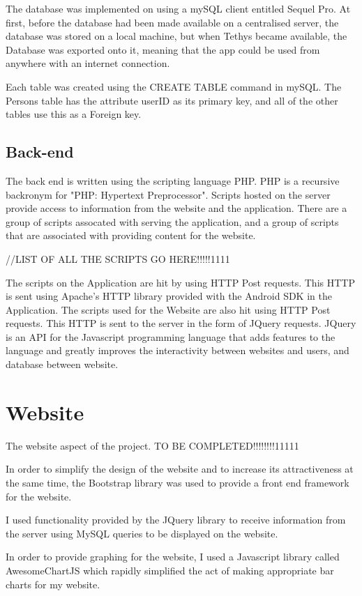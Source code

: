 \documentclass{l4proj}
\begin{document}
The database was implemented on using a mySQL client entitled Sequel Pro. At first, before the database had been made available on a centralised server, the database was stored on a local machine, but when Tethys became available, the Database was exported onto it, meaning that the app could be used from anywhere with an internet connection.

Each table was created using the CREATE TABLE command in mySQL. The Persons table has the attribute userID as its primary key, and all of the other tables use this as a Foreign key.

\subsection{Back-end}

The back end is written using the scripting language PHP. PHP is a recursive backronym for "PHP: Hypertext Preprocessor". Scripts hosted on the server provide access to information from the website and the application. There are a group of scripts assocated with serving the application, and a group of scripts that are associated with providing content for the website. 

//LIST OF ALL THE SCRIPTS GO HERE!!!!!1111

The scripts on the Application are hit by using HTTP Post requests. This HTTP is sent using Apache's HTTP library provided with the Android SDK in the Application. 
The scripts used for the Website are also hit using HTTP Post requests. This HTTP is sent to the server in the form of JQuery requests. JQuery is an API for the Javascript programming language that adds features to the language and greatly improves the interactivity between websites and users, and database between website.

\section{Website}

The website aspect of the project. TO BE COMPLETED!!!!!!!!11111

In order to simplify the design of the website and to increase its attractiveness at the same time, the Bootstrap library was used to provide a front end framework for the website.

I used functionality provided by the JQuery library to receive information from the server using MySQL queries to be displayed on the website.

In order to provide graphing for the website, I used a Javascript library called AwesomeChartJS which rapidly simplified the act of making appropriate bar charts for my website.
\end{document}
